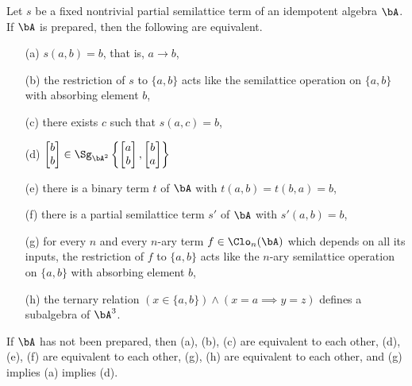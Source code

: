 \begin{thm} Let $s$ be a fixed nontrivial partial semilattice term of an idempotent algebra $\bA$. If $\bA$ is prepared, then the following are equivalent.
\begin{itemize}
\item[(a)] $s(a,b) = b$, that is, $a \rightarrow b$,

\item[(b)] the restriction of $s$ to $\{a,b\}$ acts like the semilattice operation on $\{a,b\}$ with absorbing element $b$,

\item[(c)] there exists $c$ such that $s(a,c) = b$,

\item[(d)] $\begin{bmatrix}b \\ b\end{bmatrix} \in \Sg_{\bA^2}\left\{\begin{bmatrix}a \\ b\end{bmatrix}, \begin{bmatrix}b \\ a\end{bmatrix}\right\}$

\item[(e)] there is a binary term $t$ of $\bA$ with $t(a,b) = t(b,a) = b$,

\item[(f)] there is a partial semilattice term $s'$ of $\bA$ with $s'(a,b) = b$,

\item[(g)] for every $n$ and every $n$-ary term $f \in \Clo_n(\bA)$ which depends on all its inputs, the restriction of $f$ to $\{a,b\}$ acts like the $n$-ary semilattice operation on $\{a,b\}$ with absorbing element $b$,

\item[(h)] the ternary relation $(x \in \{a,b\}) \wedge (x = a \implies y = z)$ defines a subalgebra of $\bA^3$.
\end{itemize}
If $\bA$ has not been prepared, then (a), (b), (c) are equivalent to each other, (d), (e), (f) are equivalent to each other, (g), (h) are equivalent to each other, and (g) implies (a) implies (d).
\end{thm}

